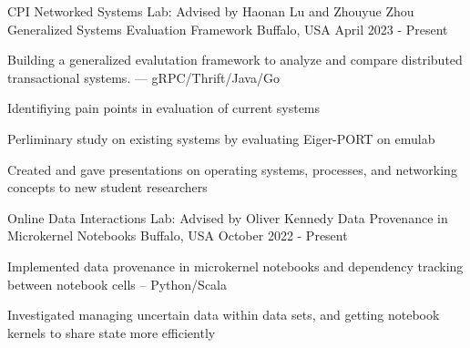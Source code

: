

\begin{cventries}


  \cventry
    {CPI Networked Systems Lab: Advised by Haonan Lu and Zhouyue Zhou} %
    {Generalized Systems Evaluation Framework} %
    {Buffalo, USA} %
    {April 2023 - Present} %
    {
      \begin{cvitems} %
        \item Building a generalized evalutation framework to analyze and compare distributed transactional systems. --- gRPC/Thrift/Java/Go
        \item Identifiying pain points in evaluation of current systems
        \item Perliminary study on existing systems by evaluating Eiger-PORT on emulab
        \item Created and gave presentations on operating systems, processes, and networking concepts to new student researchers
      \end{cvitems}
    }


  \cventry
    {Online Data Interactions Lab: Advised by Oliver Kennedy} %
    {Data Provenance in Microkernel Notebooks} %
    {Buffalo, USA} %
    {October 2022 - Present} %
    {
      \begin{cvitems} %
        \item Implemented data provenance in microkernel notebooks and dependency tracking between notebook cells -- Python/Scala
        \item Investigated managing uncertain data within data sets, and getting notebook kernels to share state more efficiently
      \end{cvitems}
    }

\end{cventries}
